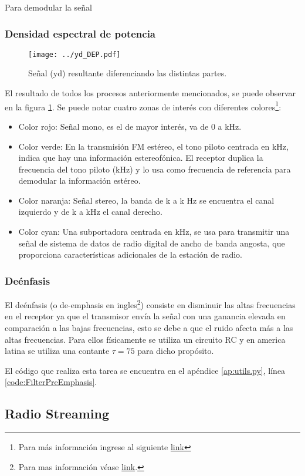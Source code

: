 Para demodular la señal 

\subsubsection{Densidad espectral de potencia}

\begin{figure}[ht!]
	\centering
	\texttt{[image: ../yd\_DEP.pdf]}
	\caption{Señal (yd) resultante diferenciando las distintas partes.}
	\label{fig:yd-DEP}
\end{figure}

El resultado de todos los procesos anteriormente mencionados, se puede observar en la figura \ref{fig:yd-DEP}.
Se puede notar cuatro zonas de interés con diferentes colores\footnote{Para más información ingrese al siguiente \href{https://en.wikipedia.org/wiki/FM\_broadcasting\#Other\_subcarrier\_services}{link}}:

\begin{itemize}
	\item Color rojo: Señal mono, es el de mayor interés, va de 0 a \limitMono kHz.
	\item Color verde: En la transmisión FM estéreo, el tono piloto centrada en \pilotTone kHz, indica que hay una información estereofónica. El receptor duplica la frecuencia del tono piloto (\centeredStereo kHz) y lo usa como frecuencia de referencia para demodular la información estéreo.
	\item Color naranja: Señal stereo, la banda de \leftLimitStereo k a \centeredStereo k Hz se encuentra el canal izquierdo y de \centeredStereo k a \rightLimitStereo kHz el canal derecho.
	\item Color cyan: Una subportadora centrada en \digitalCarrier kHz, se usa para transmitir una señal de sistema de datos de radio digital de ancho de banda angosta, que proporciona características adicionales de la estación de radio.
\end{itemize}

\subsubsection{Deénfasis}
El deénfasis (o de-emphasis en ingles\footnote{Para mas información véase \href{https://en.wikipedia.org/wiki/FM\_broadcasting\#Pre-emphasis\_and_de-emphasis}{link}.}) consiste en disminuir las altas frecuencias en el receptor ya que el transmisor envía la señal con una ganancia elevada en comparación a las bajas frecuencias, esto se debe a que el ruido afecta más a las altas frecuencias.
Para ellos físicamente se utiliza un circuito RC y en america latina se utiliza una contante $\tau = 75$ para dicho propósito.

El código que realiza esta tarea se encuentra en el apéndice \ref{ap:utils.py}, línea \ref{code:FilterPreEmphasis}.

\newpage

\subsection{Radio Streaming}


